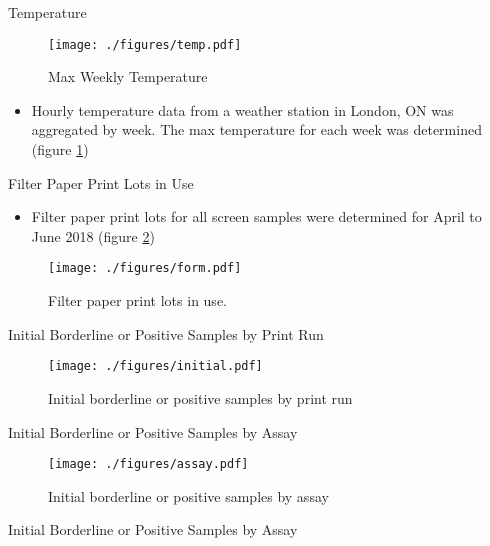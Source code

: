 \documentclass[presentation, smaller]{beamer}
\begin{document}
\begin{frame}[label={sec:orgheadline14}]{Temperature}
\begin{figure}[htb]
\centering
\texttt{[image: ./figures/temp.pdf]}
\caption{\label{fig:temp}
Max Weekly Temperature}
\end{figure}

\begin{itemize}
\item Hourly temperature data from a weather station in London, ON was
aggregated by week. The max temperature for each week was
determined (figure \ref{fig:temp})
\end{itemize}
\end{frame}

\begin{frame}[label={sec:orgheadline15}]{Filter Paper Print Lots in Use}
\begin{itemize}
\item Filter paper print lots for all screen samples were determined for April to June 2018 (figure \ref{fig:form})
\end{itemize}

\begin{figure}[htb]
\centering
\texttt{[image: ./figures/form.pdf]}
\caption{\label{fig:form}
Filter paper print lots in use.}
\end{figure}
\end{frame}

\begin{frame}[label={sec:orgheadline16}]{Initial Borderline or Positive Samples by Print Run}
\begin{figure}[htb]
\centering
\texttt{[image: ./figures/initial.pdf]}
\caption{\label{fig:initial}
Initial borderline or positive samples by print run}
\end{figure}
\end{frame}


\begin{frame}[label={sec:orgheadline17}]{Initial Borderline or Positive Samples by Assay}
\begin{figure}[htb]
\centering
\texttt{[image: ./figures/assay.pdf]}
\caption{\label{fig:assay}
Initial borderline or positive samples by assay}
\end{figure}
\end{frame}

\begin{frame}[label={sec:orgheadline18}]{Initial Borderline or Positive Samples by Assay}

\end{frame}
\end{document}
